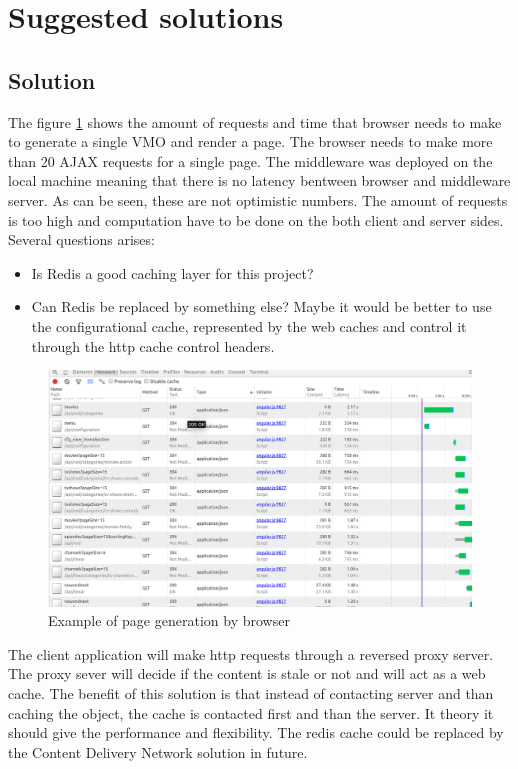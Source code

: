 \section{Suggested solutions}

\subsection{Solution}

The figure \ref{fig:req_amount} shows the amount of requests and time that browser needs to make to generate a single VMO and  render a page. The browser needs to make more than 20 AJAX requests for a single page. The middleware was deployed on the local machine meaning that there is no latency bentween browser and middleware server. As can be seen, these are not optimistic numbers. The amount of requests is too high and computation have to be done on the both client and server sides. Several questions arises:
\begin{itemize}
	\item Is Redis a good caching layer for this project?
	\item Can Redis be replaced by something else? Maybe it would be better to use the configurational cache, represented by the web caches and control it through the http cache control headers.
\end{itemize}


\begin{figure}[h]
    \centering
	\includegraphics[width=\textwidth]{images/amount_of_requests.png}
    \caption{Example of page generation by browser}
    \label{fig:req_amount}
\end{figure}


The client application will make http requests through a reversed proxy server. The proxy sever will decide if the content is stale or not and will act as a web cache. The benefit of this solution is that instead of contacting server and than caching the object, the cache is contacted first and than the server. It theory it should give the performance and flexibility. The redis cache could be replaced by the Content Delivery Network solution in future. 

